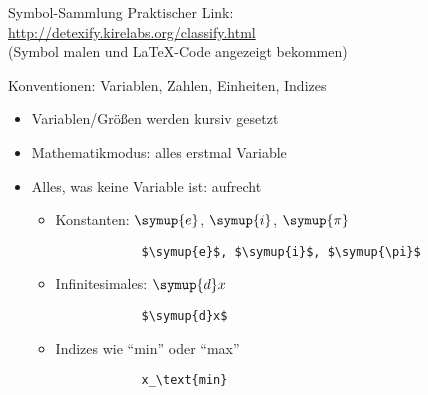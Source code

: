 \begin{frame}[fragile]{
  Symbol-Sammlung
  \hfill{}
  \hfill{}
}
  Praktischer Link: \\
  \url{http://detexify.kirelabs.org/classify.html} \\
  (Symbol malen und \LaTeX-Code angezeigt bekommen)
\end{frame}

\begin{frame}[fragile]{Konventionen: Variablen, Zahlen, Einheiten, Indizes}
  \begin{itemize}
    \item Variablen/Größen werden kursiv gesetzt
    \item Mathematikmodus: alles erstmal Variable
    \item Alles, was keine Variable ist: aufrecht
      \begin{itemize}
        \item Konstanten: $\symup{e}$, $\symup{i}$, $\symup{\pi}$
          \smallskip
          \begin{lstlisting}
            $\symup{e}$, $\symup{i}$, $\symup{\pi}$
          \end{lstlisting}
          \medskip
        \item Infinitesimales: $\symup{d}x$
          \smallskip
          \begin{lstlisting}
            $\symup{d}x$
          \end{lstlisting}
          \medskip
        \item Indizes wie \enquote{min} oder \enquote{max}
          \smallskip
          \begin{lstlisting}
            x_\text{min}
          \end{lstlisting}
      \end{itemize}
  \end{itemize}
\end{frame}

